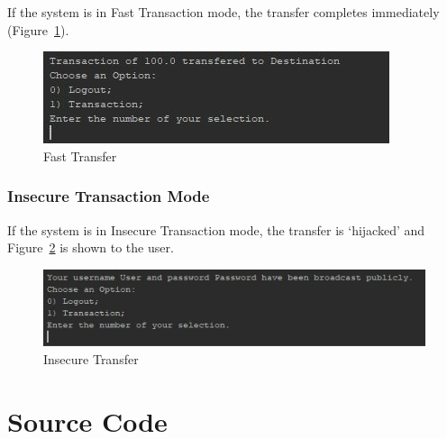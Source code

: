 \documentclass[12pt,twocolumn]{IEEEtran}
\begin{document}
If the system is in Fast Transaction mode, the transfer completes immediately (Figure~\ref{fig:fast}).

\begin{figure}[h!]
	\centering
	\includegraphics[width=0.4\linewidth]{./Resources/cli-fast.jpg}
	\caption{Fast Transfer} \label{fig:fast}
\end{figure}

\subsubsection{Insecure Transaction Mode}

If the system is in Insecure Transaction mode, the transfer is `hijacked' and Figure~\ref{fig:insecure} is shown to the user.

\begin{figure}[h!]
	\centering
	\includegraphics[width=0.4\linewidth]{./Resources/cli-bad.jpg}
	\caption{Insecure Transfer} \label{fig:insecure}
\end{figure}


\clearpage
\section{Source Code} \label{app:code}
\setcounter{figure}{0}  
\setcounter{equation}{0} 
\setcounter{table}{0}










\end{document}
